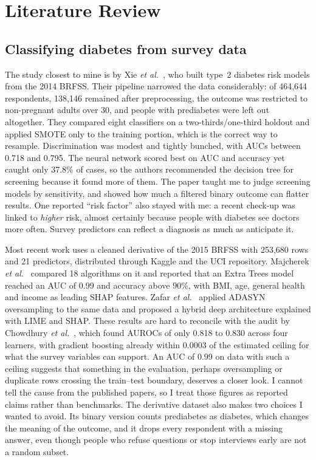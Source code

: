 \section{Literature Review}
\label{sec:lit}

\subsection{Classifying diabetes from survey data}
The study closest to mine is by Xie \emph{et al.}~\cite{xie2019}, who built type~2 diabetes risk models from the 2014 BRFSS. Their pipeline narrowed the data considerably: of 464,644 respondents, 138,146 remained after preprocessing, the outcome was restricted to non-pregnant adults over 30, and people with prediabetes were left out altogether. They compared eight classifiers on a two-thirds/one-third holdout and applied SMOTE only to the training portion, which is the correct way to resample. Discrimination was modest and tightly bunched, with AUCs between 0.718 and 0.795. The neural network scored best on AUC and accuracy yet caught only 37.8\% of cases, so the authors recommended the decision tree for screening because it found more of them. The paper taught me to judge screening models by sensitivity, and showed how much a filtered binary outcome can flatter results. One reported ``risk factor'' also stayed with me: a recent check-up was linked to \emph{higher} risk, almost certainly because people with diabetes see doctors more often. Survey predictors can reflect a diagnosis as much as anticipate it.

Most recent work uses a cleaned derivative of the 2015 BRFSS with 253,680 rows and 21 predictors, distributed through Kaggle and the UCI repository. Majcherek \emph{et al.}~\cite{majcherek2025} compared 18 algorithms on it and reported that an Extra Trees model reached an AUC of 0.99 and accuracy above 90\%, with BMI, age, general health and income as leading SHAP features. Zafar \emph{et al.}~\cite{zafar2025} applied ADASYN oversampling to the same data and proposed a hybrid deep architecture explained with LIME and SHAP. These results are hard to reconcile with the audit by Chowdhury \emph{et al.}~\cite{chowdhury2026}, which found AUROCs of only 0.818 to 0.830 across four learners, with gradient boosting already within 0.0003 of the estimated ceiling for what the survey variables can support. An AUC of 0.99 on data with such a ceiling suggests that something in the evaluation, perhaps oversampling or duplicate rows crossing the train--test boundary, deserves a closer look. I cannot tell the cause from the published papers, so I treat those figures as reported claims rather than benchmarks. The derivative dataset also makes two choices I wanted to avoid. Its binary version counts prediabetes as diabetes, which changes the meaning of the outcome, and it drops every respondent with a missing answer, even though people who refuse questions or stop interviews early are not a random subset.

